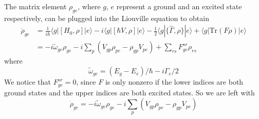 The matrix element $\rho_{ge}$, where $g$, $e$ represent a ground and an
excited state respectively, can be plugged into the Liouville equation to
obtain
\begin{equation}
\begin{split}
  \dot{\rho}_{ge}  & =  
   \frac{1}{i\hbar} \langle g | [ H_{0}, \rho ] | e \rangle  
 - i \langle g | [ \hbar V, \rho ] | e \rangle 
 - \frac{1}{2}\langle g | \lbrace \hat{\Gamma}, \rho \rbrace | e \rangle 
 + \langle g | \text{Tr}( F \rho ) | e \rangle  \\
 & = -i \tilde{\omega}_{ge}  \rho_{ge}  
     -i \sum_{p}\left( V_{gp} \rho_{pe} - \rho_{gp}V_{pe} \right) 
     +  \sum_{rs} F_{ge}^{sr} \rho_{rs}
\end{split} 
\end{equation}
where 
\begin{equation}
  \tilde{\omega}_{ge} = (E_{g} - E_{e})/\hbar - i \Gamma_{e} /2 
\end{equation}
We notice that $F_{ge}^{sr} = 0$, since $F$ is only nonzero if the lower
indices are both ground states and the upper indices are both excited states.
So we are left with 
\begin{equation}
  \dot{\rho}_{ge}  =  
     -i \tilde{\omega}_{ge}  \rho_{ge}  
     -i \sum_{p}\left( V_{gp} \rho_{pe} - \rho_{gp}V_{pe} \right) 
\end{equation}

